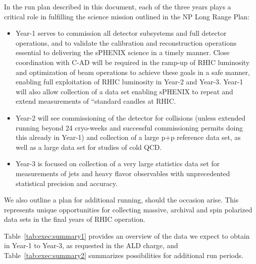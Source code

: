 In the run plan described in this document, each of the three years
plays a critical role in fulfilling the science mission outlined in
the NP Long Range Plan:
\begin{itemize}
\item Year-1 serves to commission all detector subsystems and full
  detector operations, and to validate the calibration and
  reconstruction operations essential to delivering the sPHENIX
  science in a timely manner. Close coordination with C-AD will be
  required in the ramp-up of RHIC luminosity and optimization of beam
  operations to achieve these goals in a safe manner, enabling full
  exploitation of RHIC luminosity in Year-2 and Year-3. Year-1 will
  also allow collection of a \auau data set enabling sPHENIX to repeat
  and extend measurements of ``standard candles at RHIC.
\item Year-2 will see commissioning of the detector for \pp collisions
  (unless extended running beyond 24 cryo-weeks and successful \auau
  commissioning permits doing this already in Year-1) and collection
  of a large p+p reference data set, as well as a large \pAu data set
  for studies of cold QCD.
\item Year-3 is focused on collection of a very large statistics \auau
  data set for measurements of jets and heavy flavor observables with
  unprecedented statistical precision and accuracy.
\end{itemize}

We also outline a plan for additional running, should the occasion
arise. This represents unique opportunities for collecting massive,
archival \auau and spin polarized \pp data sets in the final years of
RHIC operation.

Table~\ref{tab:exec:summary1} provides an overview of the data we
expect to obtain in Year-1 to Year-3, as requested in the ALD charge,
and Table~\ref{tab:exec:summary2} summarizes possibilities for
additional run periods.

